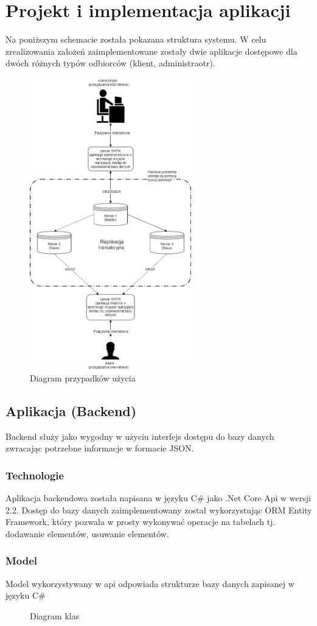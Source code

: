\documentclass{article}
\begin{document}
\section{Projekt i implementacja aplikacji}
Na poniższym schemacie została pokazana struktura systemu. W celu zrealizowania założeń zaimplementowane zostały dwie aplikacje dostępowe dla dwóch różnych typów odbiorców (klient, administraotr).
			\begin{figure}[hbt!]
				\includegraphics[width=7cm]{Files/Pictures/SystemStruct}
				\centering
				\caption{Diagram przypadków użycia}
			\end{figure}
			\newpage
	\subsection{Aplikacja (Backend)}
	Backend służy jako wygodny w użyciu interfejs dostępu do bazy danych zwracając potrzebne informacje w formacie JSON.
		\subsubsection{Technologie}
		Aplikacja backendowa została napisana w języku C\# jako .Net Core Api w wersji 2.2. Dostęp do bazy danych zaimplementowany został wykorzystując ORM Entity Framework, który pozwala w prosty wykonywać operacje na tabelach tj. dodawanie elementów, usuwanie elementów.
		\subsubsection{Model}
			Model wykorzystywany w api odpowiada strukturze bazy danych zapisanej w języku C\#
			\begin{figure}
				\centering
				\caption{Diagram klas}
			\end{figure}
\end{document}
